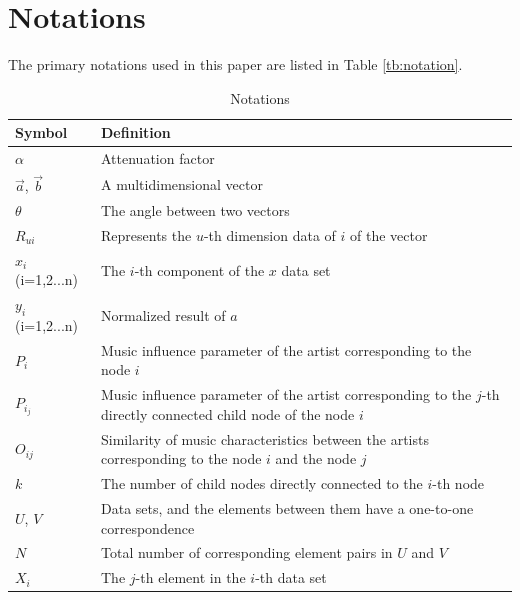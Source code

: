 \documentclass[12pt]{article}  %
\begin{document}
\section{Notations}
The primary notations used in this paper are listed in Table \ref{tb:notation}.

\begin{table}[h]
\begin{center}
\caption{Notations}
\begin{tabular}{ll}
	\toprule
	\multicolumn{1}{m{3cm}}{\centering Symbol}
	&\multicolumn{1}{p{0.75\columnwidth}}{\centering Definition}\\
	\midrule
	$\alpha$&\multicolumn{1}{p{0.75\columnwidth}}{Attenuation factor} \\
    $\vec{a}$, $\vec{b}$&\multicolumn{1}{p{0.75\columnwidth}}{A multidimensional vector}\\
    $\theta$&\multicolumn{1}{p{0.75\columnwidth}}{The angle between two vectors}\\
    $R_{ui}$ &\multicolumn{1}{p{0.75\columnwidth}}{Represents the $u$-th dimension data of $i$ of the vector}\\
    $x_i$ (i=1,2...n)&\multicolumn{1}{p{0.75\columnwidth}}{The $i$-th component of the $x$ data set}\\
    $y_i$ (i=1,2...n) &\multicolumn{1}{p{0.75\columnwidth}}{Normalized result of $a$}\\
    $P_i$ &\multicolumn{1}{p{0.75\columnwidth}}{Music influence parameter of the artist corresponding to the node $i$}\\
    $P_{i_j}$ &\multicolumn{1}{p{0.75\columnwidth}}{Music influence parameter of the artist corresponding to the $j$-th directly connected child node of the node $i$}\\
    $O_{ij}$ &\multicolumn{1}{p{0.75\columnwidth}}{Similarity of music characteristics between the artists corresponding to the node $i$ and the node $j$}\\
    $k$ &\multicolumn{1}{p{0.75\columnwidth}}{The number of child nodes directly connected to the $i$-th node}\\
    $U$, $V$ &\multicolumn{1}{p{0.75\columnwidth}}{Data sets, and the elements between them have a one-to-one correspondence}\\
    $N$ &\multicolumn{1}{p{0.75\columnwidth}}{Total number of corresponding element pairs in $U$ and $V$}\\
    $X_i$ &\multicolumn{1}{p{0.75\columnwidth}}{The $j$-th element in the $i$-th data set}\\

\end{tabular}
\end{center}
\end{table}
\end{document}
